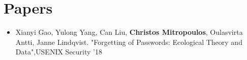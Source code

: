 \documentclass[letterpaper,10pt]{article}
\begin{document}
\section{Papers}
\begin{itemize}
	\item Xianyi Gao, Yulong Yang, Can Liu, \textbf{Christos Mitropoulos}, Oulasvirta Antti, Janne Lindqvist. "Forgetting of Passwords: Ecological Theory and Data",USENIX Security '18\\
\end{itemize}

 




\end{document}
